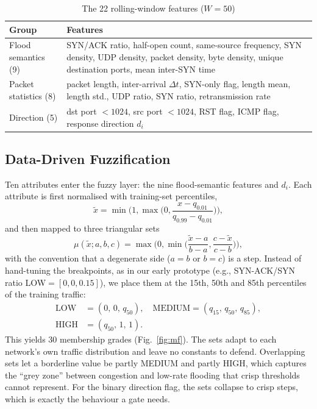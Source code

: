 \documentclass[conference]{IEEEtran}
\begin{document}
\begin{table}[t]
\centering
\caption{The 22 rolling-window features ($W=50$)}
\label{tab:features}
\footnotesize
\renewcommand{\arraystretch}{1.1}
\begin{tabular}{@{}>{\raggedright\arraybackslash}p{1.65cm} >{\raggedright\arraybackslash}p{6.2cm}@{}}
\toprule
\textbf{Group} & \textbf{Features} \\
\midrule
Flood semantics (9) & SYN/ACK ratio, half-open count, same-source frequency, SYN density, UDP density, packet density, byte density, unique destination ports, mean inter-SYN time \\
Packet statistics (8) & packet length, inter-arrival $\Delta t$, SYN-only flag, length mean, length std., UDP ratio, SYN ratio, retransmission rate \\
Direction (5) & dst port $<1024$, src port $<1024$, RST flag, ICMP flag, response direction $d_i$ \\
\bottomrule
\end{tabular}
\end{table}

\subsection{Data-Driven Fuzzification}
Ten attributes enter the fuzzy layer: the nine flood-semantic features and $d_i$. Each attribute is first normalised with training-set percentiles,
\begin{equation}
  \tilde{x}=\min\!\Big(1,\max\!\Big(0,\frac{x-q_{0.01}}{q_{0.99}-q_{0.01}}\Big)\Big),
\end{equation}
and then mapped to three triangular sets
\begin{equation}
  \mu(\tilde{x};a,b,c)=\max\!\Big(0,\min\!\Big(\frac{\tilde{x}-a}{b-a},\frac{c-\tilde{x}}{c-b}\Big)\Big),
\end{equation}
with the convention that a degenerate side ($a=b$ or $b=c$) is a step. Instead of hand-tuning the breakpoints, as in our early prototype (e.g., SYN-ACK/SYN ratio LOW$=[0,0,0.15]$), we place them at the 15th, 50th and 85th percentiles of the training traffic:
\begin{equation}
\begin{aligned}
  \mathrm{LOW}&=(0,\,0,\,q_{50}),\quad \mathrm{MEDIUM}=(q_{15},\,q_{50},\,q_{85}),\\
  \mathrm{HIGH}&=(q_{50},\,1,\,1).
\end{aligned}
\end{equation}
This yields 30 membership grades (Fig.~\ref{fig:mf}). The sets adapt to each network's own traffic distribution and leave no constants to defend. Overlapping sets let a borderline value be partly MEDIUM and partly HIGH, which captures the ``grey zone'' between congestion and low-rate flooding that crisp thresholds cannot represent. For the binary direction flag, the sets collapse to crisp steps, which is exactly the behaviour a gate needs.
\end{document}
